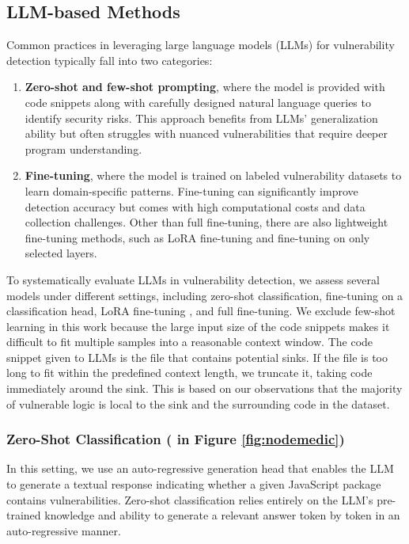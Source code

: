 \documentclass[12pt,openany,oneside,table]{cmuthesis}
\begin{document}
\subsection{LLM-based Methods}
Common practices in leveraging large language models (LLMs) for vulnerability detection typically fall into two categories:
\begin{enumerate}
    \item \textbf{Zero-shot and few-shot prompting}, where the model is provided with code snippets along with carefully designed natural language queries to identify security risks. This approach benefits from LLMs' generalization ability but often struggles with nuanced vulnerabilities that require deeper program understanding.
    \item \textbf{Fine-tuning}, where the model is trained on labeled vulnerability datasets to learn domain-specific patterns. Fine-tuning can significantly improve detection accuracy but comes with high computational costs and data collection challenges. Other than full fine-tuning, there are also lightweight fine-tuning methods, such as LoRA fine-tuning \cite{lora, qlora} and fine-tuning on only selected layers.
\end{enumerate}

To systematically evaluate LLMs in vulnerability detection, we assess several models under different settings, including zero-shot classification, fine-tuning on a classification head, LoRA fine-tuning \cite{lora, qlora}, and full fine-tuning. We exclude few-shot learning in this work because the large input size of the code snippets makes it difficult to fit multiple samples into a reasonable context window.
The code snippet given to LLMs is the file that contains potential sinks. If the file is too long to fit within the predefined context length, we truncate it, taking code immediately around the sink. This is based on our observations that the majority of vulnerable logic is local to the sink and the surrounding code in the dataset. 

\subsubsection{Zero-Shot Classification \textup{( in Figure \ref{fig:nodemedic})}}
 
In this setting, we use an auto-regressive generation head that enables the LLM to generate a textual response indicating whether a given JavaScript package contains vulnerabilities. 
%
Zero-shot classification relies entirely on the LLM's pre-trained knowledge and ability to generate a relevant answer token by token in an auto-regressive manner.
\end{document}
